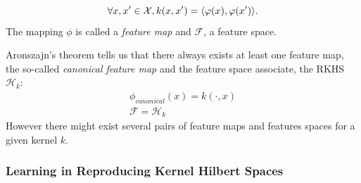\begin{Proposition}
\begin{proposition}
    \begin{equation}
    \forall x, x' \in \mathcal{X}, k(x,x')=\langle\varphi(x),\varphi(x')\rangle.
    \end{equation}
    The mapping $\phi$ is called a {\it feature map} and $\mathcal{F}$, a feature space.
    \end{proposition}
    \begin{remark}
    Aronszajn's theorem tells us that there always exists at least one feature map, the so-called {\it canonical feature map} and the feature space associate, the \acl{RKHS} $\mathcal{H}_k$:
    \begin{eqnarray*}
    \phi_{canonical}(x)= k(\cdot, x)\\
    \mathcal{F}= \mathcal{H}_k
    \end{eqnarray*}
    However there might exist several pairs of feature maps and features spaces for a given kernel $k$.
    \end{remark}
    
 \subsubsection{Learning in Reproducing Kernel Hilbert Spaces}


\end{Proposition}
